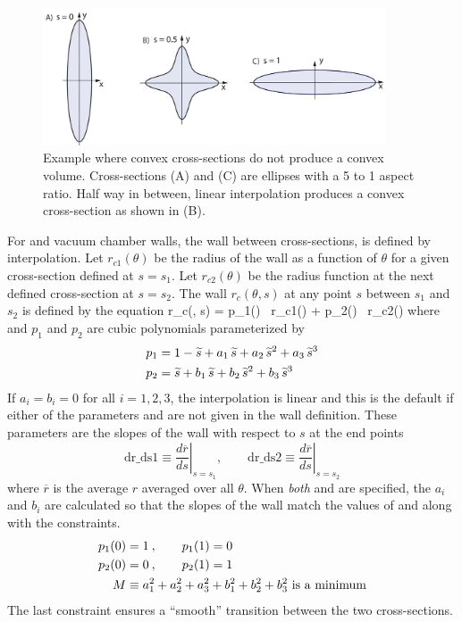 \begin{figure}[tb]
  \centering
  \includegraphics[width=4in]{concave-capillary.pdf}
  \caption[Convex cross-sections do not guarantee a convex volume.]
{Example where convex cross-sections do not produce a convex volume.
Cross-sections (A) and (C) are ellipses with a 5 to 1 aspect ratio.
Half way in between, linear interpolation produces a convex cross-section
as shown in (B).} 
  \label{f:concave.capillary}
\end{figure}

For  and vacuum chamber walls, the wall between
cross-sections, is defined by interpolation. Let $r_{c1}(\theta)$ be
the radius of the wall as a function of $\theta$ for a given
cross-section defined at $s = s_1$. Let $r_{c2}(\theta)$ be the radius
function at the next defined cross-section at $s = s_2$. The wall
$r_c(\theta, s)$ at any point $s$ between $s_1$ and $s_2$ is defined
by the equation
\Begineq
  r_c(\theta, s) = p_1(\stilde) \, r_{c1}(\theta) + p_2(\stilde) \, r_{c2}(\theta)
\Endeq
where 
\Begineq
  \stilde \equiv {}
\Endeq
and $p_1$ and $p_2$ are cubic polynomials parameterized by
\begin{align}
  p_1 &= 1 - {\widetilde s} + a_1 \, {\widetilde s} + a_2 \, {\widetilde s}^2 + a_3 \, {\widetilde s}^3 \nonumber \\
  p_2 &= {\widetilde s} + b_1 \, {\widetilde s} + b_2 \, {\widetilde s}^2 + b_3 \, {\widetilde s}^3 
\end{align}
If $a_i = b_i = 0$ for all $i = 1, 2, 3$, the interpolation is linear
and this is the default if either of the parameters  and
 are not given in the wall definition. These parameters are
the slopes of the wall with respect to $s$ at the end points
\begin{equation}
  \text{dr_ds1} \equiv \left. \frac{d\overline{r}}{ds} \right|_{s = s_1} \comma \qquad
  \text{dr_ds2} \equiv \left. \frac{d\overline{r}}{ds} \right|_{s = s_2} 
\end{equation}
where $\overline{r}$ is the average $r$ averaged over all
$\theta$. When {\em both}  and  are specified, the $a_i$
and $b_i$ are calculated so that the slopes of the wall match 
the values of  and  along with the constraints.
\begin{align}
  p_1(0) &= 1 \> , \qquad p_1(1) = 0 \nonumber \\
  p_2(0) &= 0 \> , \qquad p_2(1) = 1 \\
  M &\equiv a_1^2 + a_2^2 + a_3^2 + b_1^2 + b_2^2 + b_3^2 \text{ is a minimum}
  \nonumber
\end{align}
The last constraint ensures a ``smooth'' transition between the two cross-sections.

